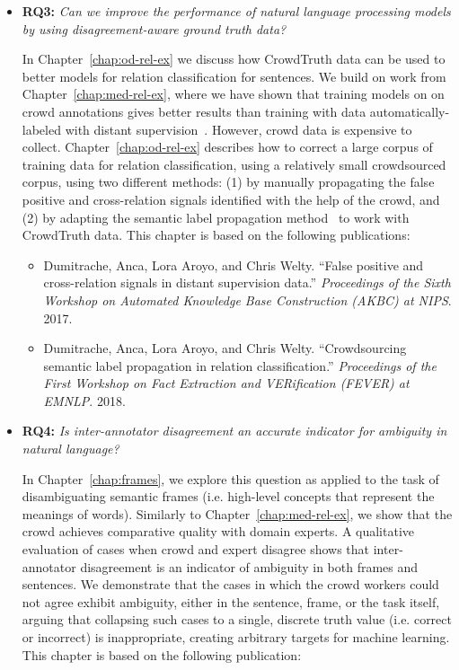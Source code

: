 \begin{itemize}
    \item \textbf{RQ3:} \textit{Can we improve the performance of natural language processing models by using disagreement-aware ground truth data?}
    
    In Chapter~\ref{chap:od-rel-ex} we discuss how CrowdTruth data can be used to better models for relation classification for sentences. We build on work from Chapter~\ref{chap:med-rel-ex}, where we have shown that training models on on crowd annotations gives better results than training with data automatically-labeled with distant supervision~\cite{mintz2009distant}. However, crowd data is expensive to collect. Chapter~\ref{chap:od-rel-ex} describes how to correct a large corpus of training data for relation classification, using a relatively small crowdsourced corpus, using two different methods: (1) by manually propagating the false positive and cross-relation signals identified with the help of the crowd, and (2) by adapting the semantic label propagation method~\cite{sterckx2016knowledge} to work with CrowdTruth data. This chapter is based on the following publications:
    
    \begin{itemize}
        \item Dumitrache, Anca, Lora Aroyo, and Chris Welty. ``False positive and cross-relation signals in distant supervision data.'' \textit{Proceedings of the Sixth Workshop on Automated Knowledge Base Construction (AKBC) at NIPS}. 2017.~\cite{dumitrache2017false}
        
        \item Dumitrache, Anca, Lora Aroyo, and Chris Welty. ``Crowdsourcing semantic label propagation in relation classification.'' \textit{Proceedings of the First Workshop on Fact Extraction and VERification (FEVER) at EMNLP}. 2018.~\cite{dumitrache2018crowdsourcing}
    \end{itemize}

    \item \textbf{RQ4:} \textit{Is inter-annotator disagreement an accurate indicator for ambiguity in natural language?}
    
    In Chapter~\ref{chap:frames}, we explore this question as applied to the task of disambiguating semantic frames (i.e. high-level concepts that represent the meanings of words). Similarly to Chapter~\ref{chap:med-rel-ex}, we show that the crowd achieves comparative quality with domain experts. A qualitative evaluation of cases when crowd and expert disagree shows that inter-annotator disagreement is an indicator of ambiguity in both frames and sentences. We demonstrate that the cases in which the crowd workers could not agree exhibit ambiguity, either in the sentence, frame, or the task itself, arguing that collapsing such cases to a single, discrete truth value (i.e. correct or incorrect) is inappropriate, creating arbitrary targets for machine learning. This chapter is based on the following publication:
    

\end{itemize}
